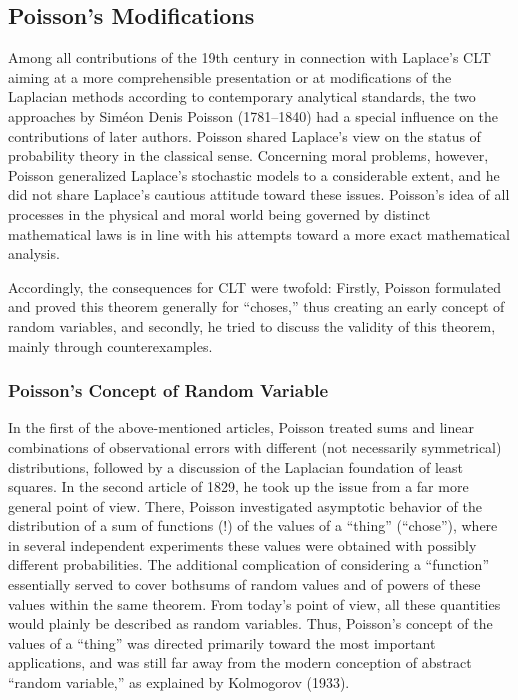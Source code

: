 \documentclass{article}
\begin{document}
\subsection{Poisson’s Modifications}
Among all contributions of the 19th century in connection with Laplace’s CLT aiming at a more comprehensible presentation or at modifications of the Laplacian methods according to contemporary analytical standards, the two approaches \cite{Dodge2008Concise} by Siméon Denis Poisson (1781–1840) had a special influence on the contributions of later authors. 
Poisson shared Laplace’s view on the status of probability theory in the classical sense.
Concerning moral problems, however, Poisson generalized Laplace’s stochastic models to a considerable extent, and he did not share Laplace’s cautious attitude toward these issues. Poisson’s idea of all processes in the physical and moral world being governed by distinct mathematical laws is in line with his attempts toward a more exact mathematical analysis. 

Accordingly, the consequences for CLT were twofold: Firstly, Poisson formulated and proved this theorem generally for “choses,” thus creating an early concept of random variables, and secondly, he tried to discuss the validity of this theorem, mainly through counterexamples.
\subsubsection{Poisson’s Concept of Random Variable}
In the first \cite{Fischer2010History} of the above-mentioned articles, Poisson treated sums and linear
combinations of observational errors with different (not necessarily symmetrical)
distributions, followed by a discussion of the Laplacian foundation of least squares.
In the second article of 1829, he took up the issue from a far more general point of
view. There, Poisson investigated asymptotic behavior of the distribution of a sum
of functions (!) of the values of a “thing” (“chose”), where in several independent
experiments these values were obtained with possibly different probabilities. The
additional complication of considering a “function” essentially served to cover bothsums of random values and of powers of these values within the same theorem. 
From today’s point of view, all these quantities would plainly be described as random variables. Thus, Poisson’s concept of the values of a “thing” was directed primarily toward the most important applications, and was still far away from the modern conception of abstract “random variable,” as explained by Kolmogorov (1933).
\end{document}
